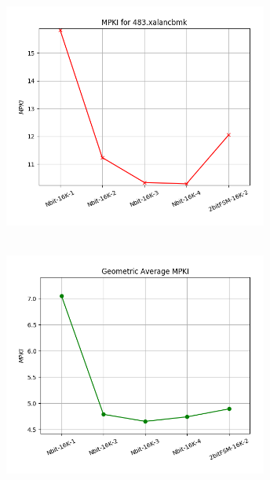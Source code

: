    \begin{minipage}{\textwidth}
      \begin{center}
         \\
         \vspace{3mm}
         \includegraphics[width=0.65\textwidth, frame]{./graphs/4-2i/483-xalancbmk.png}
         \vspace{6mm}
      \end{center}
   \end{minipage}

   \begin{minipage}{\textwidth}
      \begin{center}
         \\
         \vspace{3mm}
         \includegraphics[width=0.65\textwidth, frame]{./graphs/4-2i/mean.png}
         \vspace{6mm}
      \end{center}
   \end{minipage}

